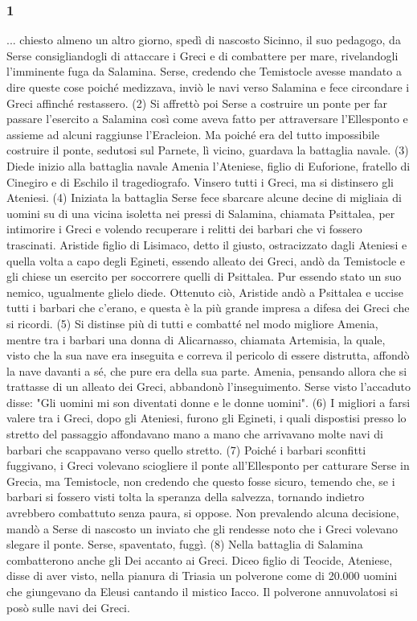 \subsubsection*{1}... chiesto almeno un altro giorno, spedì di nascosto Sicinno, il suo pedagogo, da Serse consigliandogli di attaccare i Greci e di combattere per mare, rivelandogli l'imminente fuga da Salamina. Serse, credendo che Temistocle avesse mandato a dire queste cose poiché medizzava, inviò le navi verso Salamina e  fece circondare i Greci affinché restassero. (2) Si affrettò poi Serse a costruire un ponte per far passare l'esercito a Salamina così come aveva fatto per attraversare l'Ellesponto e assieme ad alcuni raggiunse l'Eracleion. Ma poiché era del tutto impossibile costruire il ponte, sedutosi sul Parnete, lì vicino, guardava la battaglia navale. (3) Diede inizio alla battaglia navale Amenia l'Ateniese, figlio di Euforione, fratello di Cinegiro e di Eschilo il tragediografo.  Vinsero tutti i Greci, ma si distinsero gli Ateniesi. (4) Iniziata la battaglia Serse fece sbarcare alcune decine di migliaia di uomini su di una vicina isoletta nei pressi di Salamina, chiamata Psittalea, per intimorire i Greci e volendo recuperare i relitti dei barbari che vi fossero trascinati. Aristide figlio di Lisimaco, detto il giusto, ostracizzato dagli Ateniesi e quella volta a capo degli Egineti, essendo alleato dei Greci, andò da Temistocle e gli chiese un esercito per soccorrere quelli di Psittalea. Pur essendo stato un suo nemico, ugualmente glielo diede. Ottenuto ciò, Aristide andò a Psittalea e uccise tutti i barbari che c'erano, e questa è la più grande impresa a difesa dei Greci che si ricordi. (5) Si distinse più di tutti e combatté nel modo migliore Amenia, mentre tra i barbari una donna di Alicarnasso, chiamata Artemisia, la quale, visto che la sua nave era inseguita e correva il pericolo di essere distrutta, affondò la nave davanti a sé, che pure era della sua parte. Amenia, pensando allora che si trattasse di un alleato dei Greci, abbandonò l'inseguimento. Serse visto l'accaduto disse: "Gli uomini mi son diventati donne e le donne uomini". (6)  I migliori a farsi valere tra i Greci, dopo gli Ateniesi, furono gli Egineti, i quali dispostisi presso lo stretto del passaggio affondavano mano a mano che arrivavano molte navi di barbari che scappavano verso quello stretto. (7) Poiché i barbari sconfitti fuggivano, i Greci volevano sciogliere il ponte all'Ellesponto per catturare Serse in Grecia, ma Temistocle,  non credendo che questo fosse sicuro, temendo che, se i barbari si fossero visti tolta la speranza della salvezza, tornando indietro avrebbero combattuto senza paura, si oppose. Non prevalendo alcuna decisione, mandò a Serse di nascosto un inviato che gli rendesse noto che i Greci volevano slegare il ponte. Serse, spaventato, fuggì. (8) Nella battaglia di Salamina combatterono anche gli Dei accanto ai Greci.  Diceo figlio di Teocide, Ateniese, disse di aver visto, nella pianura di Triasia un polverone come di 20.000 uomini che giungevano da Eleusi cantando il mistico Iacco. Il polverone annuvolatosi si posò sulle navi dei Greci. 

